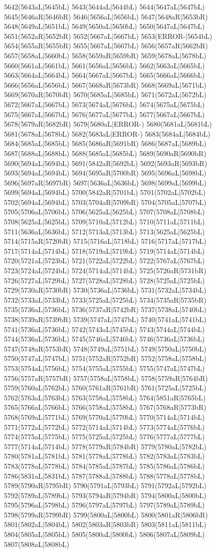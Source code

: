 5642(5643aL|5645bL) 5643(5644aL|5644bL) 5644(5647aL|5647bL) 5645(5646aR|5646bR) 5646(5656aL|5656bL) 5647(5648aR|5653bR) 5648(5649aL|5651bL) 5649(5650aL|5650bL) 5650(5647aL|5647bL) 5651(5652aR|5652bR) 5652(5667aL|5667bL) 5653(ERROR-|5654bL) 5654(5655aR|5655bR) 5655(5667aL|5667bL) 5656(5657aR|5662bR) 5657(5658aL|5660bL) 5658(5659aR|5659bR) 5659(5678aL|5678bL) 5660(5661aL|5661bL) 5661(5656aL|5656bL) 5662(5663aL|5665bL) 5663(5664aL|5664bL) 5664(5667aL|5667bL) 5665(5666aL|5666bL) 5666(5656aL|5656bL) 5667(5668aR|5673bR) 5668(5669aL|5671bL) 5669(5670aR|5670bR) 5670(5685aL|5685bL) 5671(5672aL|5672bL) 5672(5667aL|5667bL) 5673(5674aL|5676bL) 5674(5675aL|5675bL) 5675(5667aL|5667bL) 5676(5677aL|5677bL) 5677(5667aL|5667bL) 5678(5679aR|5682bR) 5679(5680aL|ERROR-) 5680(5681aL|5681bL) 5681(5678aL|5678bL) 5682(5683aL|ERROR-) 5683(5684aL|5684bL) 5684(5685aL|5685bL) 5685(5686aR|5691bR) 5686(5687aL|5689bL) 5687(5688aL|5688bL) 5688(5685aL|5685bL) 5689(5690aR|5690bR) 5690(5694aL|5694bL) 5691(5842aR|5692bL) 5692(5693aR|5693bR) 5693(5694aL|5694bL) 5694(5695aR|5700bR) 5695(5696aL|5698bL) 5696(5697aR|5697bR) 5697(5636aL|5636bL) 5698(5699aL|5699bL) 5699(5694aL|5694bL) 5700(5842aR|5701bL) 5701(5702aL|5702bL) 5702(5694aL|5694bL) 5703(5704aR|5709bR) 5704(5705aL|5707bL) 5705(5706aL|5706bL) 5706(5625aL|5625bL) 5707(5708aL|5708bL) 5708(5625aL|5625bL) 5709(5710aL|5712bL) 5710(5711aL|5711bL) 5711(5636aL|5636bL) 5712(5713aL|5713bL) 5713(5625aL|5625bL) 5714(5715aR|5720bR) 5715(5716aL|5718bL) 5716(5717aL|5717bL) 5717(5714aL|5714bL) 5718(5719aL|5719bL) 5719(5714aL|5714bL) 5720(5721aL|5723bL) 5721(5722aL|5722bL) 5722(5767aL|5767bL) 5723(5724aL|5724bL) 5724(5714aL|5714bL) 5725(5726aR|5731bR) 5726(5727aL|5729bL) 5727(5728aL|5728bL) 5728(5725aL|5725bL) 5729(5730aR|5730bR) 5730(5736aL|5736bL) 5731(5732aL|5734bL) 5732(5733aL|5733bL) 5733(5725aL|5725bL) 5734(5735aR|5735bR) 5735(5736aL|5736bL) 5736(5737aR|5742bR) 5737(5738aL|5740bL) 5738(5739aR|5739bR) 5739(5747aL|5747bL) 5740(5741aL|5741bL) 5741(5736aL|5736bL) 5742(5743aL|5745bL) 5743(5744aL|5744bL) 5744(5736aL|5736bL) 5745(5746aL|5746bL) 5746(5736aL|5736bL) 5747(5748aR|5753bR) 5748(5749aL|5751bL) 5749(5750aL|5750bL) 5750(5747aL|5747bL) 5751(5752aR|5752bR) 5752(5758aL|5758bL) 5753(5754aL|5756bL) 5754(5755aL|5755bL) 5755(5747aL|5747bL) 5756(5757aR|5757bR) 5757(5758aL|5758bL) 5758(5759aR|5764bR) 5759(5760aL|5762bL) 5760(5761aR|5761bR) 5761(5725aL|5725bL) 5762(5763aL|5763bL) 5763(5758aL|5758bL) 5764(5851aR|5765bL) 5765(5766aL|5766bL) 5766(5758aL|5758bL) 5767(5768aR|5773bR) 5768(5769aL|5771bL) 5769(5770aL|5770bL) 5770(5714aL|5714bL) 5771(5772aL|5772bL) 5772(5714aL|5714bL) 5773(5774aL|5776bL) 5774(5775aL|5775bL) 5775(5725aL|5725bL) 5776(5777aL|5777bL) 5777(5714aL|5714bL) 5778(5779aR|5784bR) 5779(5780aL|5782bL) 5780(5781aL|5781bL) 5781(5778aL|5778bL) 5782(5783aL|5783bL) 5783(5778aL|5778bL) 5784(5785aL|5787bL) 5785(5786aL|5786bL) 5786(5831aL|5831bL) 5787(5788aL|5788bL) 5788(5778aL|5778bL) 5789(5790aR|5795bR) 5790(5791aL|5793bL) 5791(5792aL|5792bL) 5792(5789aL|5789bL) 5793(5794aR|5794bR) 5794(5800aL|5800bL) 5795(5796aL|5798bL) 5796(5797aL|5797bL) 5797(5789aL|5789bL) 5798(5799aR|5799bR) 5799(5800aL|5800bL) 5800(5801aR|5806bR) 5801(5802aL|5804bL) 5802(5803aR|5803bR) 5803(5811aL|5811bL) 5804(5805aL|5805bL) 5805(5800aL|5800bL) 5806(5807aL|5809bL) 5807(5808aL|5808bL) 